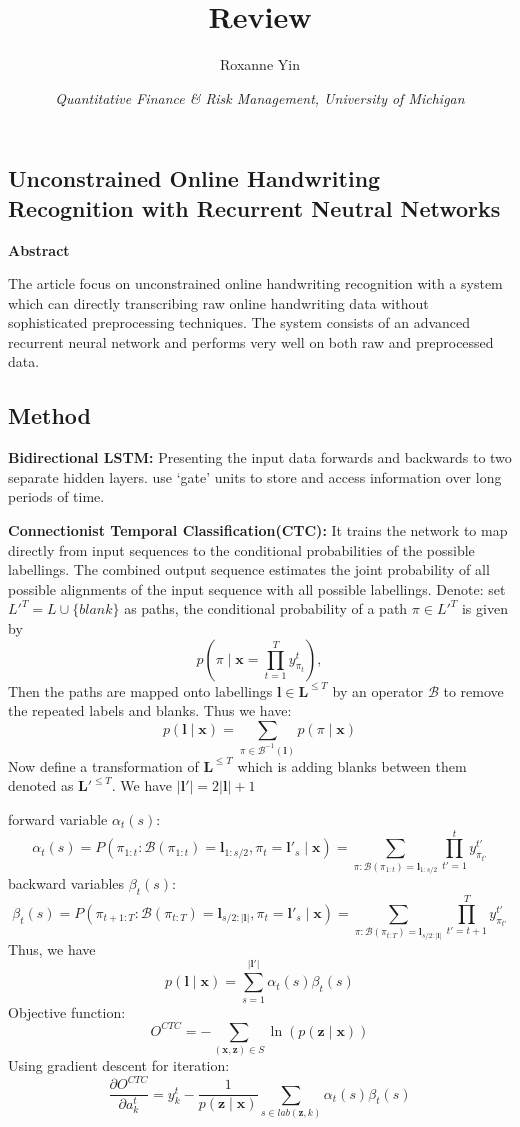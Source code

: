 \documentclass[letterpaper]{article}
\author{Roxanne Yin}
\date{\small\it Quantitative Finance \& Risk Management, University of Michigan}
\title{Review}
\begin{document}
\large
\maketitle
\begin{spacing}{1.1}  %
\section{Unconstrained Online Handwriting Recognition with Recurrent Neutral Networks}
\begin{center}
\textbf{Abstract}
\end{center}
The article focus on unconstrained online handwriting recognition with a system which can directly transcribing raw online handwriting data without sophisticated preprocessing techniques. The system consists of an advanced recurrent neural network and performs very well on both raw and preprocessed data.
\subsection*{Method}
\textbf{Bidirectional LSTM:} Presenting the input data forwards and backwards to two separate hidden layers. use `gate' units to store and access information over long periods of time.

\textbf{Connectionist Temporal Classification(CTC):} It trains the network to map directly from input sequences to the conditional probabilities of the possible labellings.
The combined output sequence estimates the joint probability of all possible alignments of the input sequence with all possible labellings.
Denote: set $L'^{T} = L \cup \{blank\}$ as paths, the conditional probability of a path $\pi \in L'^{T}$ is given by
$$
p(\pi \mid \textbf{x} = \prod_{t=1}^{T} y_{\pi_t}^t),
$$
Then the paths are mapped onto labellings $\textbf{l} \in \textbf{L}^{\leq T}$ by an operator $\mathcal{B}$ to remove the repeated labels and blanks. Thus we have:
$$
p(\textbf{l} \mid \textbf{x}) = \sum_{\pi \in \mathcal{B}^{-1}(\textbf{l})} p(\pi \mid \textbf{x})
$$
Now define a transformation of $\textbf{L}^{\leq T}$ which is adding blanks between them denoted as $\textbf{L}'^{\leq T}$. We have $\vert{\textbf{l}'}\vert = 2\vert{\textbf{l}}\vert + 1$

forward variable $\alpha_t(s)$:
$$
\alpha_t(s) = P(\pi_{1:t} : \mathcal{B}(\pi_{1:t}) = \textbf{l}_{1:s/2}, \pi_t = \textbf{l}'_s \mid \textbf{x}) = \sum_{\pi : \mathcal{B}(\pi_{1:t}) = \textbf{l}_{1:s/2}} \prod_{t' = 1}^t y_{\pi_{t'}}^{t'}
$$
backward variables $\beta_t(s)$:
$$
\beta_t(s) = P(\pi_{t+1:T} : \mathcal{B}(\pi_{t:T}) = \textbf{l}_{s/2:\vert\textbf{l}\vert}, \pi_t = \textbf{l}'_s \mid \textbf{x}) = \sum_{\pi : \mathcal{B}(\pi_{t:T}) = \textbf{l}_{s/2:\vert\textbf{l}\vert}} \prod_{t' = t+1}^T y_{\pi_{t'}}^{t'}
$$
Thus, we have
$$
p(\textbf{l} \mid \textbf{x}) = \sum_{s=1}^{\vert\textbf{l}'\vert} \alpha_t(s)\beta_t(s)
$$
Objective function:
$$
O^{CTC} = - \sum_{(\textbf{x},\textbf{z}) \in S} \ln(p(\textbf{z} \mid \textbf{x}))
$$
Using gradient descent for iteration:
$$
\frac{\partial O^{CTC}}{\partial a_k^t} = y_k^t - \frac{1}{p(\textbf{z} \mid \textbf{x})} \sum_{s \in lab(\textbf{z},k)} \alpha_t(s) \beta_t(s)
$$


\end{spacing}
\end{document}
